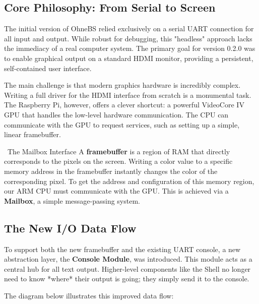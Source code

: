 \documentclass[a4paper, 11pt]{article}
\begin{document}
	\subsection{Core Philosophy: From Serial to Screen}
	The initial version of OhneBS relied exclusively on a serial UART connection for all input and output. While robust for debugging, this "headless" approach lacks the immediacy of a real computer system. The primary goal for version 0.2.0 was to enable graphical output on a standard HDMI monitor, providing a persistent, self-contained user interface.
	
	The main challenge is that modern graphics hardware is incredibly complex. Writing a full driver for the HDMI interface from scratch is a monumental task. The Raspberry Pi, however, offers a clever shortcut: a powerful VideoCore IV GPU that handles the low-level hardware communication. The CPU can communicate with the GPU to request services, such as setting up a simple, linear framebuffer.
	
	\begin{infobox}{\faCogs\ The Mailbox Interface}
		A \textbf{framebuffer} is a region of RAM that directly corresponds to the pixels on the screen. Writing a color value to a specific memory address in the framebuffer instantly changes the color of the corresponding pixel. To get the address and configuration of this memory region, our ARM CPU must communicate with the GPU. This is achieved via a \textbf{Mailbox}, a simple message-passing system.
	\end{infobox}
	
	\subsection{The New I/O Data Flow}
	To support both the new framebuffer and the existing UART console, a new abstraction layer, the \textbf{Console Module}, was introduced. This module acts as a central hub for all text output. Higher-level components like the Shell no longer need to know *where* their output is going; they simply send it to the console.
	
	The diagram below illustrates this improved data flow:
	
\end{document}
